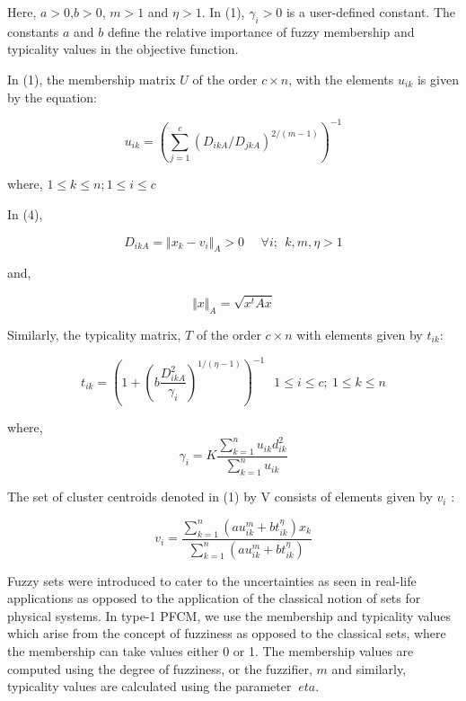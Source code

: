 \documentclass[journal, onecolumn]{IEEEtran}
\begin{document}
Here, $a>0$,$b>0$, $m>1$ and $\eta>1$. In (1), $\gamma_i>0$ is a user-defined constant. The constants $a$ and $b$ define the relative importance of fuzzy membership and typicality values in the objective function. 

In (1), the membership matrix $U$ of the order $c\times n$, with the elements $u_{ik}$  is given by the equation:

\begin{equation}
u_{ik}=(\sum_{j=1}^c (D_{ikA}/D_{jkA})^{2/(m-1)})^{-1}  
\end{equation}

where, 
$1 \leq k \leq n; 1 \leq i \leq c$

In (4), 

\begin{equation}
D_{ikA}= {\Vert x_k - v_i \Vert }_A >0  \:\:\:\:\:\: \forall i;\:\: k,m,\eta >1
\end{equation}

and, 

\begin{equation}
{\Vert x \Vert}_A = \sqrt{x^t A x}
\end{equation}

Similarly, the typicality matrix, $T$ of the order $ c\times n$  with elements given by $t_{ik}$:

\begin{equation}
t_{ik} = (1+ (b \frac{D_{ikA}^2}{\gamma_i})^{1/(\eta -1)})^{-1} \;\:\: 1 \leq i \leq c; \: 1 \leq k \leq n
\end{equation}

where, 
\begin{equation}
\gamma_i= K \frac{\sum_{k=1}^n u_{ik} d_{ik}^2}{\sum_{k=1}^n u_{ik}}
\end{equation}


The set of cluster centroids denoted in (1) by V consists of elements given by $v_i$ : 

\begin{equation}
v_i = \frac{\sum_{k=1}^n (au_{ik}^m + bt_{ik}^\eta)x_k}{\sum_{k=1}^n (au_{ik}^m + bt_{ik}^\eta)}
\end{equation}

Fuzzy sets were introduced to cater to the uncertainties as seen in real-life applications as opposed to the application of the classical notion of sets for physical systems. In type-1 PFCM, we use the membership and typicality values which arise from the concept of fuzziness as opposed to the classical sets, where the membership can take values either 0 or 1. The membership values are computed using the degree of fuzziness, or the fuzzifier, $m$ and similarly, typicality values are calculated using the parameter $\ eta$. 
\end{document}
